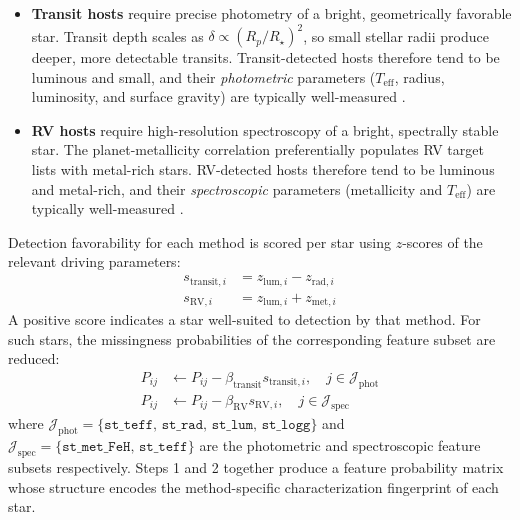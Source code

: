 \documentclass[preprint,longauthor,twocolumn]{aastex631}
\begin{document}
\begin{itemize}
  \item \textbf{Transit hosts} require precise photometry of a bright, geometrically favorable star. Transit depth scales as $\delta \propto (R_p/R_\star)^2$, so small stellar radii produce deeper, more detectable transits. Transit-detected hosts therefore tend to be luminous and small, and their \emph{photometric} parameters ($T_{\mathrm{eff}}$, radius, luminosity, and surface gravity) are typically well-measured \citep{burkeTERRESTRIALPLANETOCCURRENCE2015}.

  \item \textbf{RV hosts} require high-resolution spectroscopy of a bright, spectrally stable star. The planet-metallicity correlation preferentially populates RV target lists with metal-rich stars. RV-detected hosts therefore tend to be luminous and metal-rich, and their \emph{spectroscopic} parameters (metallicity and $T_{\mathrm{eff}}$) are typically well-measured \citep{mirchandaniDetectionBiasesMethodological2025}.
\end{itemize}

Detection favorability for each method is scored per star using $z$-scores of the relevant driving parameters:
\begin{align}
  s_{\mathrm{transit},i} &= z_{\mathrm{lum},i} - z_{\mathrm{rad},i} \label{eq:transit-score} \\
  s_{\mathrm{RV},i}      &= z_{\mathrm{lum},i} + z_{\mathrm{met},i} \label{eq:rv-score}
\end{align}
A positive score indicates a star well-suited to detection by that method. For such stars, the missingness probabilities of the corresponding feature subset are reduced:
\begin{align}
  P_{ij} &\leftarrow P_{ij} - \beta_{\mathrm{transit}}s_{\mathrm{transit},i},
    \quad j \in \mathcal{J}_{\mathrm{phot}} \label{eq:transit-dropout} \\
  P_{ij} &\leftarrow P_{ij} - \beta_{\mathrm{RV}}s_{\mathrm{RV},i},
    \quad j \in \mathcal{J}_{\mathrm{spec}} \label{eq:rv-dropout}
\end{align}
where $\mathcal{J}_{\mathrm{phot}} = \{\texttt{st\_teff},\, \texttt{st\_rad},\, \texttt{st\_lum},\, \texttt{st\_logg}\}$ and $\mathcal{J}_{\mathrm{spec}} = \{\texttt{st\_met\_FeH},\, \texttt{st\_teff}\}$ are the photometric and spectroscopic feature subsets respectively. Steps 1 and 2 together produce a feature probability matrix whose structure encodes the method-specific characterization fingerprint of each star.
\end{document}
